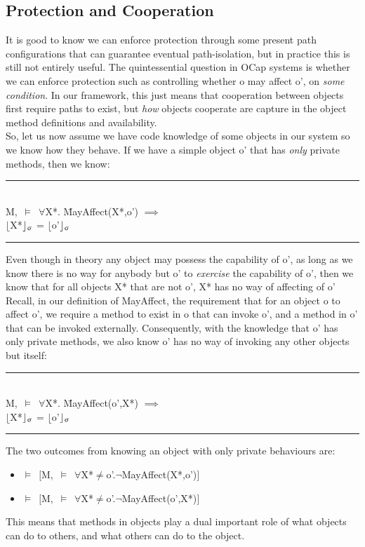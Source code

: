 \documentclass[a4paper,11pt, twoside,twocolumn]{article}
\newenvironment{logic}
{\begin{minipage}[c]{\linewidth}  \small \vspace{0.5em}\begin{tabbing}}
{\end{tabbing}\end{minipage}\vspace{0.5em}}
\newcommand{\loforall}{$\forall$}
\newcommand{\loneq} {$\neq$}
\newcommand{\loimplies}{$\implies$}
\newcommand{\losigma}{\text{$\upsigma$}}
\newcommand{\loturns} {$\vDash$}
\newcommand{\loneg}{$\boldsymbol \neg$}
\newcommand{\loexec}[2] {$\lfloor$#1$\rfloor _{\text{#2}}$}
\newcommand{\hr}{\rule{\linewidth}{0.4pt}}
\begin{document}
\subsection{Protection and Cooperation}

It is good to know we can enforce protection through some present path configurations that can guarantee eventual path-isolation, but in practice this is still not entirely useful. The quintessential question in OCap systems is whether we can enforce protection such as controlling whether o may affect o', on \textit{some condition}. In our framework, this just means that cooperation between objects first require paths to exist, but \textit{how} objects cooperate are capture in the object method definitions and availability.\\

So, let us now assume we have code knowledge of some objects in our system so we know how they behave. If we have a simple object o' that has \textit{only} private methods, then we know:

\begin{logic}
\hr\\
M,\losigma\ \loturns\ \loforall X*. \=MayAffect(X*,o') \loimplies \\
\> \loexec{X*}{\losigma} = \loexec{o'}{\losigma}\\
\hr
\end{logic}

Even though in theory any object may possess the capability of o', as long as we know there is no way for anybody but o' to \textit{exercise} the capability of o', then we know that for all objects X* that are not o', X* has no way of affecting of o' Recall, in our definition of MayAffect, the requirement that for an object o to affect o', we require a method to exist in o that can invoke o', and a method in o' that can be invoked externally. Consequently, with the knowledge that o' has only private methods, we also know o' has no way of invoking any other objects but itself:

\begin{logic}
\hr\\
M,\losigma\ \loturns\ \loforall X*. \=MayAffect(o',X*) \loimplies \\
\> \loexec{X*}{\losigma} = \loexec{o'}{\losigma}\\
\hr
\end{logic}

The two outcomes from knowing an object with only private behaviours are:
\begin{itemize}
\item \loturns\ $[$M,\losigma\ \loturns\ \loforall X*\loneq o'.\loneg MayAffect(X*,o')$]$
\item \loturns\ $[$M,\losigma\ \loturns\ \loforall X*\loneq o'.\loneg MayAffect(o',X*)$]$
\end{itemize}
This means that methods in objects play a dual important role of what objects can do to others, and what others can do to the object.
\end{document}
